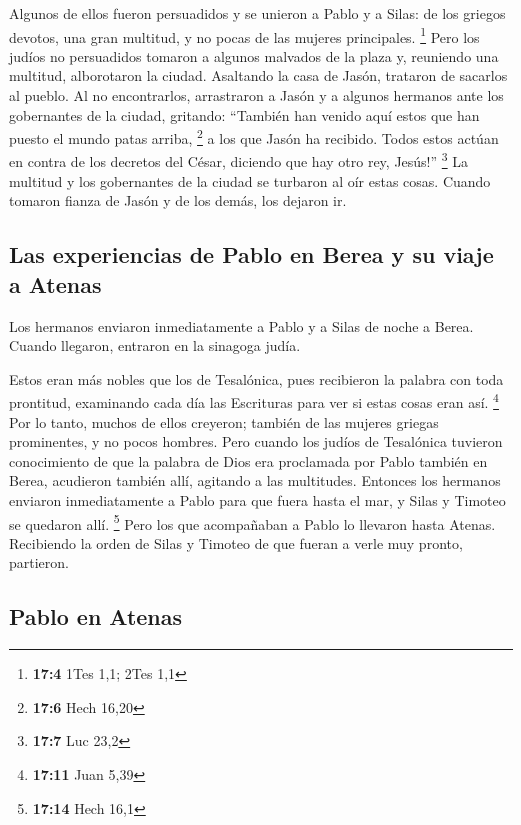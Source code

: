 \begin{paracol}{2}
 Algunos de ellos fueron persuadidos y se unieron a Pablo
y a Silas: de los griegos devotos, una gran multitud, y no pocas de las
mujeres principales. \footnote{\textbf{17:4} 1Tes 1,1; 2Tes 1,1}
 Pero los judíos no persuadidos tomaron a algunos malvados
de la plaza y, reuniendo una multitud, alborotaron la ciudad. Asaltando
la casa de Jasón, trataron de sacarlos al pueblo.  Al no
encontrarlos, arrastraron a Jasón y a algunos hermanos ante los
gobernantes de la ciudad, gritando: ``También han venido aquí estos que
han puesto el mundo patas arriba, \footnote{\textbf{17:6} Hech 16,20}
 a los que Jasón ha recibido. Todos estos actúan en contra
de los decretos del César, diciendo que hay otro rey, Jesús!''
\footnote{\textbf{17:7} Luc 23,2}  La multitud y los
gobernantes de la ciudad se turbaron al oír estas cosas. 
Cuando tomaron fianza de Jasón y de los demás, los dejaron ir.

\hypertarget{las-experiencias-de-pablo-en-berea-y-su-viaje-a-atenas}{%
\subsection{Las experiencias de Pablo en Berea y su viaje a
Atenas}\label{las-experiencias-de-pablo-en-berea-y-su-viaje-a-atenas}}

 Los hermanos enviaron inmediatamente a Pablo y a Silas
de noche a Berea. Cuando llegaron, entraron en la sinagoga judía.

 Estos eran más nobles que los de Tesalónica, pues
recibieron la palabra con toda prontitud, examinando cada día las
Escrituras para ver si estas cosas eran así. \footnote{\textbf{17:11}
  Juan 5,39}  Por lo tanto, muchos de ellos creyeron;
también de las mujeres griegas prominentes, y no pocos hombres.
 Pero cuando los judíos de Tesalónica tuvieron
conocimiento de que la palabra de Dios era proclamada por Pablo también
en Berea, acudieron también allí, agitando a las multitudes.
 Entonces los hermanos enviaron inmediatamente a Pablo
para que fuera hasta el mar, y Silas y Timoteo se quedaron allí.
\footnote{\textbf{17:14} Hech 16,1}  Pero los que
acompañaban a Pablo lo llevaron hasta Atenas. Recibiendo la orden de
Silas y Timoteo de que fueran a verle muy pronto, partieron.

\hypertarget{pablo-en-atenas}{%
\subsection{Pablo en Atenas}\label{pablo-en-atenas}}


\end{paracol}
